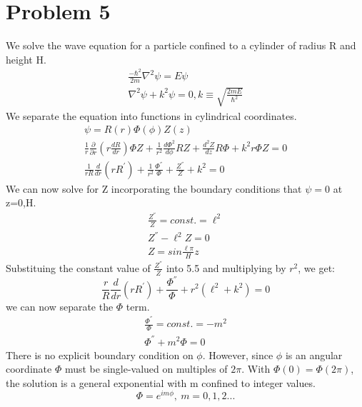 \documentclass[a4paper,10pt]{article}
\numberwithin{equation}{section}
\begin{document}
\section{Problem 5}
We solve the wave equation for a particle confined to a cylinder of radius R and height H.
\begin{gather}
\frac{-\hbar ^2}{2m} \nabla ^2 \psi=E \psi\\
\nabla ^2 \psi +k^2\psi=0, k\equiv \sqrt{\frac{2mE}{\hbar ^2}}
\end{gather}
We separate the equation into functions in cylindrical coordinates.
\begin{gather}
 \psi=R(r)\Phi(\phi)Z(z)\\
 \frac{1}{r}\frac{\partial}{\partial r}(r\frac{dR}{dr})\Phi Z+\frac{1}{r^2}\frac{d \Phi ^2}{d \phi }RZ+\frac{d^2Z}{dz}R\Phi +k^2r\Phi Z=0\\
 \frac{1}{rR}\frac{d}{dr}(rR^{'} )+\frac{1}{r^2}\frac{\Phi^{''} }{\Phi}+\frac{Z^{''}}{Z}+k^2=0
\end{gather}
We can now solve for Z incorporating the boundary conditions that $\psi=0$ at z=0,H.
\begin{gather}
\frac{Z^{''}}{Z}=const.=\ell ^2\\
 Z^{''}-\ell ^2Z=0\\
 Z=sin\frac{\ell \pi}{H}z
\end{gather}
Substituing the constant value of $\frac{Z^{''}}{Z}$ into 5.5 and multiplying by $r^2$, we get:
\begin{equation}
\frac{r}{R}\frac{d}{dr}(rR^{'})+\frac{\Phi ^{''}}{\Phi}+r^2(\ell ^2+k^2)=0 
\end{equation}
we can now separate the $\Phi$ term.
\begin{gather}
\frac{\Phi ^{''}}{\Phi}=const.=-m^2\\
\Phi ^{''}+m^2\Phi=0
\end{gather}
There is no explicit boundary condition on $\phi$. 
However, since $\phi$ is an angular coordinate $\Phi$ must be single-valued on multiples of $2\pi$. 
With $\Phi(0)=\Phi(2\pi)$, the solution is a general exponential with m confined to integer values.
\begin{equation}
\Phi=e^{im \phi}, \  m=0,1,2...
\end{equation}
\end{document}
